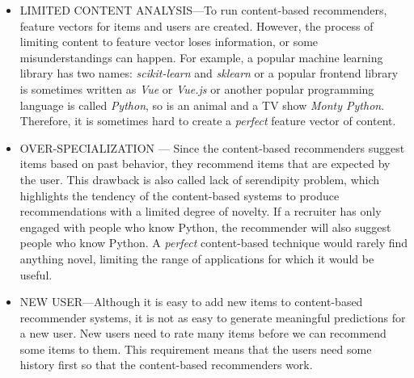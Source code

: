 \begin{itemize}
	\item LIMITED CONTENT ANALYSIS—To run content-based recommenders, feature vectors for items and users are created. However, the process of limiting content to feature vector loses information, or some misunderstandings can happen. For example, a popular machine learning library has two names: \textit{scikit-learn} and \textit{sklearn} or a popular frontend library is sometimes written as \textit{Vue} or \textit{Vue.js} or another popular programming language is called \textit{Python}, so is an animal and a TV show \textit{Monty Python}. Therefore, it is sometimes hard to create a \textit{perfect} feature vector of content.
	\item OVER-SPECIALIZATION — Since the content-based recommenders suggest items based on past behavior, they recommend items that are expected by the user. This drawback is also called lack of serendipity problem, which highlights the tendency of the content-based systems to produce recommendations with a limited degree of novelty. If a recruiter has only engaged with people who know Python, the recommender will also suggest people who know Python. A \textit{perfect} content-based technique would rarely find anything novel, limiting the range of applications for which it would be useful.
	\item NEW USER—Although it is easy to add new items to content-based recommender systems, it is not as easy to generate meaningful predictions for a new user. New users need to rate many items before we can recommend some items to them. This requirement means that the users need some history first so that the content-based recommenders work.
\end{itemize}


